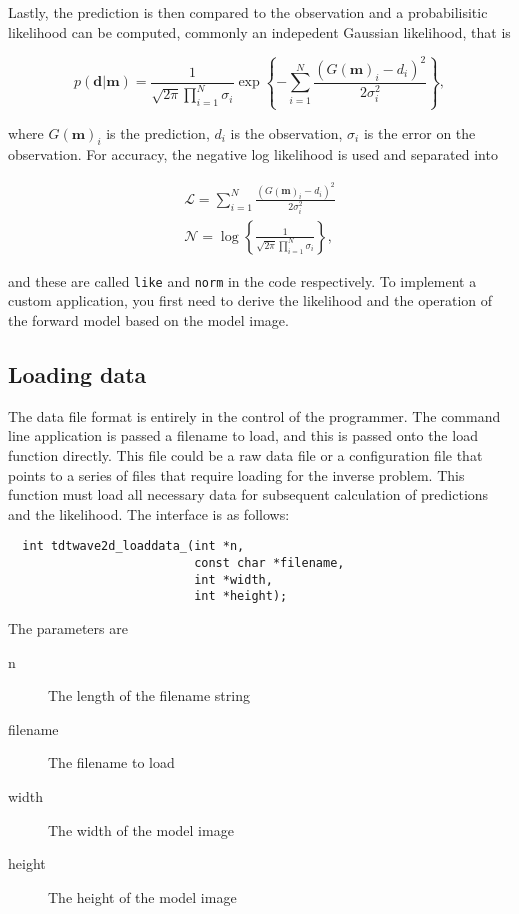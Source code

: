 \documentclass[a4paper,12pt]{article}
\begin{document}
Lastly, the prediction is then compared to the observation and a
probabilisitic likelihood can be computed, commonly an indepedent
Gaussian likelihood, that is

\begin{equation}
  p(\mathbf{d}|\mathbf{m}) = \frac{1}{\sqrt{2 \pi} \prod_{i=1}^N \sigma_i} \exp \left\{
  - \sum_{i = 1}^N \frac{(G(\mathbf{m})_i - d_i)^2}{2\sigma_i^2} \right\}
    ,
\end{equation}

where $G(\mathbf{m})_i$ is the prediction, $d_i$ is the observation,
$\sigma_i$ is the error on the observation. For accuracy, the negative
log likelihood is used and separated into

\begin{align}
  \label{eqn:like}
  \mathcal{L} = \sum_{i = 1}^N \frac{(G(\mathbf{m})_i - d_i)^2}{2\sigma_i^2} \\
  \label{eqn:norm}
  \mathcal{N} = \log \left\{ \frac{1}{\sqrt{2 \pi} \prod_{i=1}^N \sigma_i} \right\}
  ,
\end{align}

and these are called {\tt like} and {\tt norm} in the code
respectively. To implement a custom application, you first need to
derive the likelihood and the operation of the forward model based
on the model image.

\subsection{Loading data}

The data file format is entirely in the control of the programmer.
The command line application is passed a filename to load, and this is passed onto the load function
directly. This file could be a raw data file or a configuration file that points
to a series of files that require loading for the inverse problem. This function
must load all necessary data for subsequent calculation of predictions and the likelihood. The
interface is as follows:

\begin{verbatim}
  int tdtwave2d_loaddata_(int *n,
                          const char *filename,
                          int *width,
                          int *height);
\end{verbatim}

The parameters are

\begin{description}
\item[n] The length of the filename string
\item[filename] The filename to load
\item[width] The width of the model image
\item[height] The height of the model image
\end{description}
\end{document}
